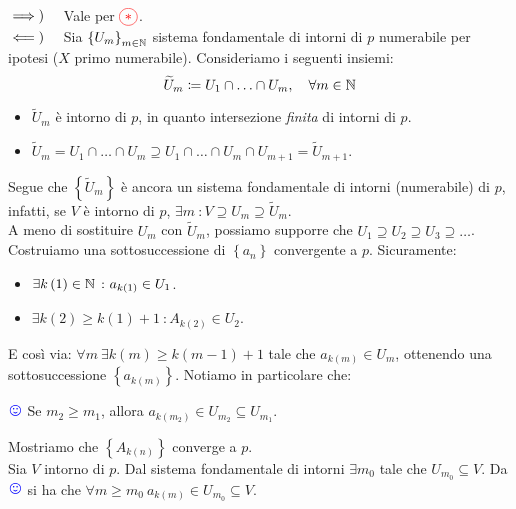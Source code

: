 \begin{demonstration}~{}\\
	$\implies)\quad$ Vale per $\textcolor{red}{\circled{\ast}}$.\\
	$\impliedby)\quad$ Sia $\left\{U_m\right\}_{m\in\mathbb{N}}$ sistema fondamentale di intorni di $p$ numerabile per ipotesi ($X$ primo numerabile). Consideriamo i seguenti insiemi:
	\begin{equation*}
	\widetilde{U}_m\coloneqq U_1\cap\ldots \cap U_m,\quad \forall m\in \mathbb{N}
	\end{equation*}
\begin{itemize}
	\item $\widetilde{U}_m$ è intorno di $p$, in quanto intersezione \textit{finita} di intorni di $p$.
	\item $\widetilde{U}_m=U_1\cap\ldots\cap U_m\supseteq U_1\cap\ldots\cap U_m\cap U_{m+1}=\widetilde{U}_{m+1}$.
\end{itemize}
Segue che $\left\{\widetilde{U}_m\right\}$ è ancora un sistema fondamentale di intorni (numerabile) di $p$, infatti, se $V$ è intorno di $p$, $\exists m\ \colon V\supseteq U_m\supseteq \widetilde{U}_m$.\\
A meno di sostituire $U_m$ con $\widetilde{U}_m$, possiamo supporre che $U_1\supseteq U_2\supseteq U_3\supseteq \ldots$.\\
Costruiamo una sottosuccessione di $\left\{a_n\right\}$ convergente a $p$. Sicuramente:
\begin{itemize}
	\item $\exists k\left(1\right)\in \mathbb{N}\ \colon a_{k\left(1\right)}\in U_1$.
	\item $\exists k\left(2\right)\geq k\left(1\right)+1\ \colon A_{k\left(2\right)}\in U_2$.
\end{itemize}
E così via: $\forall m\ \exists k\left(m\right)\geq k\left(m-1\right)+1$ tale che $a_{k\left(m\right)}\in U_m$, ottenendo una sottosuccessione $\left\{a_{k\left(m\right)}\right\}$. Notiamo in particolare che:
\begin{center}
\label{notasorridente} $\textcolor{blue}{{\large \smiley{}}}$ Se $m_2\geq m_1$, allora $a_{k\left(m_2\right)}\in U_{m_2}\subseteq U_{m_1}$.
\end{center}
Mostriamo che $\left\{A_{k\left(n\right)}\right\}$ converge a $p$.\\
Sia $V$ intorno di $p$. Dal sistema fondamentale di intorni $\exists m_0$ tale che $U_{m_0}\subseteq V$. Da $\textcolor{blue}{{\large \smiley{}}}$ si ha che $\forall m\geq m_0\ a_{k\left(m\right)}\in U_{m_0}\subseteq V$.
\end{demonstration}
